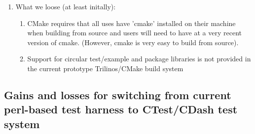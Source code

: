 \documentclass[pdf,ps2pdf,11pt]{SANDreport}
\begin{document}
\begin{enumerate}
{}\item What we loose (at least initally):

  \begin{enumerate}

  {}\item CMake requires that all uses have 'cmake' installed on their
  machine when building from source and users will need to have at a
  very recent version of cmake. (However, cmake is very easy to build
  from source).

  {}\item Support for circular test/example and package libraries is
  not provided in the current prototype Trilinos/CMake build system

  \end{enumerate}

\end{enumerate}


%
\subsection{Gains and losses for switching from current perl-based test
harness to CTest/CDash test system}
%
\end{document}
